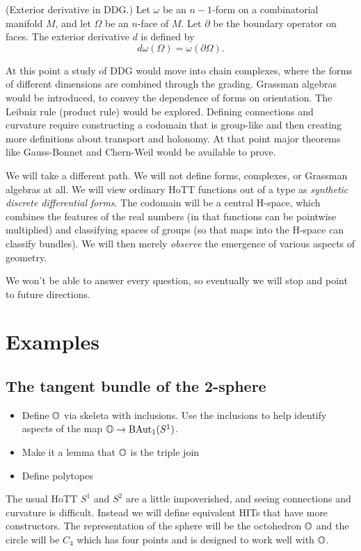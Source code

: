 \documentclass[12pt]{article}
\begin{document}
\begin{mydef}
(Exterior derivative in DDG.) Let \( \omega \) be an \( n-1 \)-form on a combinatorial manifold \( M \), and let \( \Omega \) be an \( n \)-face of \( M \). Let \( \partial \) be the boundary operator on faces. The exterior derivative \( d \) is defined by 
\[ 
 d\omega(\Omega) = \omega(\partial\Omega).
\]
\end{mydef}

At this point a study of DDG would move into chain complexes, where the forms of different dimensions are combined through the grading. Grassman algebras would be introduced, to convey the dependence of forms on orientation. The Leibniz rule (product rule) would be explored. Defining connections and curvature require constructing a codomain that is group-like and then creating more definitions about transport and holonomy. At that point major theorems like Gauss-Bonnet and Chern-Weil would be available to prove.

We will take a different path. We will not define forms, complexes, or Grassman algebras at all. We will view ordinary HoTT functions out of a type as \emph{synthetic discrete differential forms}. The codomain will be a central H-space, which combines the features of the real numbers (in that functions can be pointwise multiplied) and classifying spaces of groups (so that maps into the H-space can classify bundles). We will then merely \emph{observe} the emergence of various aspects of geometry.

We won't be able to answer every question, so eventually we will stop and point to future directions.
 
\section{Examples}
\subsection{The tangent bundle of the 2-sphere}
\begin{itemize}
\item Define \( \mathbb{O} \) via skeleta with inclusions. Use the inclusions to help identify aspects of the map \( \mathbb{O}\to\mathrm{BAut}_1(S^1) \).
\item Make it a lemma that \( \mathbb{O} \) is the triple join
\item Define polytopes
\end{itemize}

The usual HoTT \( S^1 \) and \( S^2 \) are a little impoverished, and seeing connections and curvature is difficult. Instead we will define equivalent HITs that have more constructors. The representation of the sphere will be the octohedron \( \mathbb{O} \) and the circle will be \( C_4 \) which has four points and is designed to work well with \( \mathbb{O} \).
\end{document}
